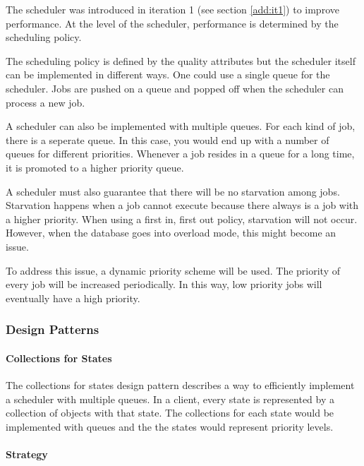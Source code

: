 
\npar The scheduler was introduced in iteration 1 (see section \ref{add:it1}) to
improve performance. At the level of the scheduler, performance is determined by
the scheduling policy. 

\npar The scheduling policy is defined by the quality attributes but the
scheduler itself can be implemented in different ways. One could use a single
queue for the scheduler. Jobs are pushed on a queue and popped off when the
scheduler can process a new job. 

\npar A scheduler can also be implemented with multiple queues. For each kind of
job, there is a seperate queue. In this case, you would end up with a number of
queues for different priorities. Whenever a job resides in a queue for a long
time, it is promoted to a higher priority queue. 

\npar A scheduler must also guarantee that there will be no starvation among
jobs. Starvation happens when a job cannot execute because there always is a
job with a higher priority. When using a first in, first out policy, starvation
will not occur. However, when the database goes into overload mode, this might
become an issue. 

\npar To address this issue, a dynamic priority scheme will be used. The
priority of every job will be increased periodically. In this way, low priority
jobs will eventually have a high priority. 

\subsubsection{Design Patterns}
\label{add:it3/patterns}

\paragraph{Collections for States}

\npar The collections for states design pattern describes a way to efficiently
implement a scheduler with multiple queues. In a client, every state is
represented by a collection of objects with that state. The collections for
each state would be implemented with queues and the the states would represent
priority levels.

\paragraph{Strategy}

